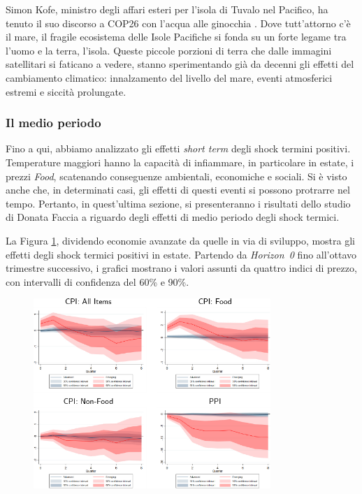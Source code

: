 Simon Kofe, ministro degli affari esteri per l'isola di Tuvalo nel Pacifico, ha tenuto il suo discorso a COP26 con l'acqua alle ginocchia \parencite{guardian:tuvalu}. Dove tutt'attorno c'è il mare, il fragile ecosistema delle Isole Pacifiche si fonda su un forte legame tra l'uomo e la terra, l'isola. Queste piccole porzioni di terra che dalle immagini satellitari si faticano a vedere, stanno sperimentando già da decenni gli effetti del cambiamento climatico: innalzamento del livello del mare, eventi atmosferici estremi e siccità prolungate.

\subsubsection{Il medio periodo}

Fino a qui, abbiamo analizzato gli effetti \textit{short term} degli shock termini positivi. Temperature maggiori hanno la capacità di infiammare, in particolare in estate, i prezzi \textit{Food}, scatenando conseguenze ambientali, economiche e sociali. Si è visto anche che, in determinati casi, gli effetti di questi eventi si possono protrarre nel tempo. Pertanto, in quest'ultima sezione, si presenteranno i risultati dello studio di Donata Faccia a riguardo degli effetti di medio periodo degli shock termici.

La Figura \ref{img:medium_term}, dividendo economie avanzate da quelle in via di sviluppo, mostra gli effetti degli shock termici positivi in estate. Partendo da \textit{Horizon~0} fino all'ottavo trimestre successivo, i grafici mostrano i valori assunti da quattro indici di prezzo, con intervalli di confidenza del 60\% e 90\%.

\begin{figure}[h]
	\centering
	\includegraphics[width=0.8\textwidth]{img/medium_term.pdf}
	\caption{}
	\label{img:medium_term}
\end{figure}

